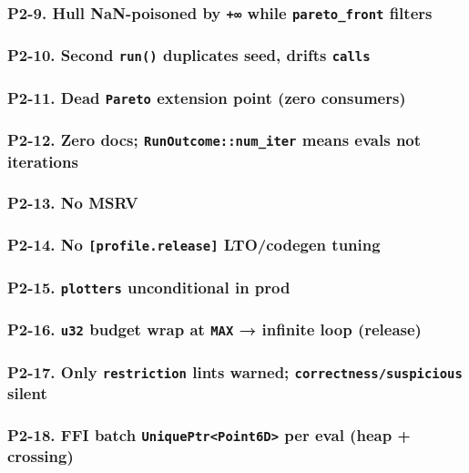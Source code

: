 \documentclass[11pt]{article}
\begin{document}
\subsubsection{P2-9. Hull NaN-poisoned by \texttt{+∞} while \texttt{pareto\_front} filters}
\label{sec:org1b234c3}
\subsubsection{P2-10. Second \texttt{run()} duplicates seed, drifts \texttt{calls}}
\label{sec:org7a96e11}
\subsubsection{P2-11. Dead \texttt{Pareto} extension point (zero consumers)}
\label{sec:orge5a973e}
\subsubsection{P2-12. Zero docs; \texttt{RunOutcome::num\_iter} means evals not iterations}
\label{sec:org9513db8}
\subsubsection{P2-13. No MSRV}
\label{sec:org2411b48}
\subsubsection{P2-14. No \texttt{[profile.release]} LTO/codegen tuning}
\label{sec:org78d34ea}
\subsubsection{P2-15. \texttt{plotters} unconditional in prod}
\label{sec:org556df1d}
\subsubsection{P2-16. \texttt{u32} budget wrap at \texttt{MAX} → infinite loop (release)}
\label{sec:org443983a}
\subsubsection{P2-17. Only \texttt{restriction} lints warned; \texttt{correctness/suspicious} silent}
\label{sec:orgba2ac63}
\subsubsection{P2-18. FFI batch \texttt{UniquePtr<Point6D>} per eval (heap + crossing)}
\label{sec:org2f3bdd0}
\end{document}
